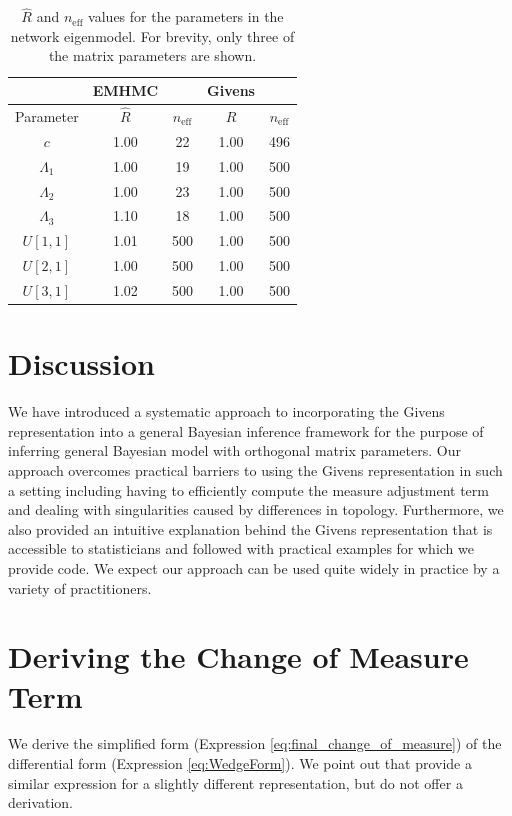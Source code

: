 \documentclass[ba]{imsart}
\numberwithin{equation}{section}
\theoremstyle{plain}
\begin{document}
\begin{table}
\begin{tabular}{|c||cc|cc|}
\hline
 & EMHMC & & Givens &\\
\hline
Parameter & $\hat{R}$ & $n_{\mathrm{eff}}$ & $\hat{R}$ & $n_{\mathrm{eff}}$\\
\hline
\hline
$c$ & 1.00 & 22 & 1.00 & 496\\
$\Lambda_1$ & 1.00 & 19 & 1.00 & 500\\
$\Lambda_2$ & 1.00 & 23 & 1.00 & 500\\
$\Lambda_3$ & 1.10 & 18 & 1.00 & 500\\
$U[1,1]$ & 1.01 & 500 & 1.00 & 500\\
$U[2,1]$ & 1.00 & 500 & 1.00 & 500\\
$U[3,1]$ & 1.02 & 500 & 1.00 & 500\\
\hline
\end{tabular}
\caption{$\hat{R}$ and $n_{\mathrm{eff}}$ values for the parameters in the network eigenmodel. For brevity, only three of the matrix parameters are shown.}
\label{tab:rhat_neff_eigennetwork}
\end{table}

\section{Discussion}\label{discussion}
We have introduced a systematic approach to incorporating the Givens representation into a general Bayesian inference framework for the purpose of inferring general Bayesian model with orthogonal matrix parameters. Our approach overcomes practical barriers to using the Givens representation in such a setting including having to efficiently compute the measure adjustment term and dealing with singularities caused by differences in topology. Furthermore, we also provided an intuitive explanation behind the Givens representation that is accessible to statisticians and followed with practical examples for which we provide code. We expect our approach can be used quite widely in practice by a variety of practitioners.

\appendix
\section{Deriving the Change of Measure Term}
We derive the simplified form (Expression \ref{eq:final_change_of_measure}) of the differential form (Expression \ref{eq:WedgeForm}). We point out that \cite{khatri1977mises} provide a similar expression for a slightly different representation, but do not offer a derivation.
\end{document}
